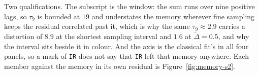 Two qualifications. The subscript is the window: the sum runs over nine positive lags, so $\tau_{9}$ is
bounded at $19$ and understates the memory wherever fine sampling keeps the residual correlated
past it, which is why the same $\tau_{9}\approx2.9$ carries a distortion of $8.9$ at the shortest
sampling interval and $1.6$ at $\widetilde{\Delta}=0.5$, and why the interval sits beside it in
colour. And the axis is the classical fit's in all four panels, so a mark of \texttt{IR} does not
say that \texttt{IR} left that memory anywhere. Each member against the memory in its own residual
is Figure~\ref{fig:memory-s2}.
%
%


